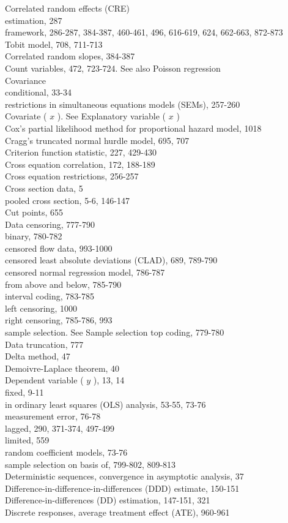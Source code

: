 \documentclass[10pt]{article}
\begin{document}
Correlated random effects (CRE)\\
estimation, 287\\
framework, 286-287, 384-387, 460-461, 496, 616-619, 624, 662-663, 872-873\\
Tobit model, 708, 711-713\\
Correlated random slopes, 384-387\\
Count variables, 472, 723-724. See also Poisson regression\\
Covariance\\
conditional, 33-34\\
restrictions in simultaneous equations models (SEMs), 257-260\\
Covariate ( $x$ ). See Explanatory variable ( $x$ )\\
Cox's partial likelihood method for proportional hazard model, 1018\\
Cragg's truncated normal hurdle model, 695, 707\\
Criterion function statistic, 227, 429-430\\
Cross equation correlation, 172, 188-189\\
Cross equation restrictions, 256-257\\
Cross section data, 5\\
pooled cross section, 5-6, 146-147\\
Cut points, 655\\
Data censoring, 777-790\\
binary, 780-782\\
censored flow data, 993-1000\\
censored least absolute deviations (CLAD), 689, 789-790\\
censored normal regression model, 786-787\\
from above and below, 785-790\\
interval coding, 783-785\\
left censoring, 1000\\
right censoring, 785-786, 993\\
sample selection. See Sample selection top coding, 779-780\\
Data truncation, 777\\
Delta method, 47\\
Demoivre-Laplace theorem, 40\\
Dependent variable ( $y$ ), 13, 14\\
fixed, 9-11\\
in ordinary least squares (OLS) analysis, 53-55, 73-76\\
measurement error, 76-78\\
lagged, 290, 371-374, 497-499\\
limited, 559\\
random coefficient models, 73-76\\
sample selection on basis of, 799-802, 809-813\\
Deterministic sequences, convergence in asymptotic analysis, 37\\
Difference-in-difference-in-differences (DDD) estimate, 150-151\\
Difference-in-differences (DD) estimation, 147-151, 321\\
Discrete responses, average treatment effect (ATE), 960-961
\end{document}
